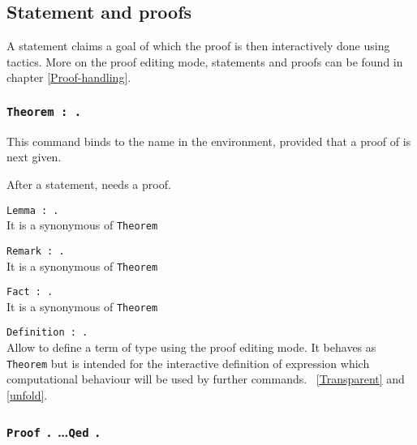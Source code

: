 \subsection{Statement and proofs}

A statement claims a goal of which the proof is then interactively done
using tactics. More on the proof editing mode, statements and proofs can be
found in chapter \ref{Proof-handling}.

\subsubsection{\tt Theorem {\ident} : {\type}.
}

This command binds {\type} to the name {\ident} in the
environment, provided that a proof of {\type} is next given.

After a statement, {\Coq} needs a proof.

\begin{Variants} 
\item {\tt Lemma {\ident} : {\type}.}\\ 
It is a synonymous of \texttt{Theorem}
\item {\tt Remark {\ident} : {\type}.}\\ 
It is a synonymous of \texttt{Theorem}
 \item {\tt Fact {\ident} : {\type}.}\\ 
It is a synonymous of \texttt{Theorem}
\item {\tt Definition {\ident} : {\type}.} \\
Allow to define a term of type {\type} using the proof editing mode. It
behaves as {\tt Theorem} but is intended for the interactive
definition of expression which computational behaviour will be used by
further commands. \SeeAlso~\ref{Transparent} and \ref{unfold}. 
\end{Variants}

\subsubsection{{\tt Proof} {\tt .} \dots {\tt Qed} {\tt .}
}

